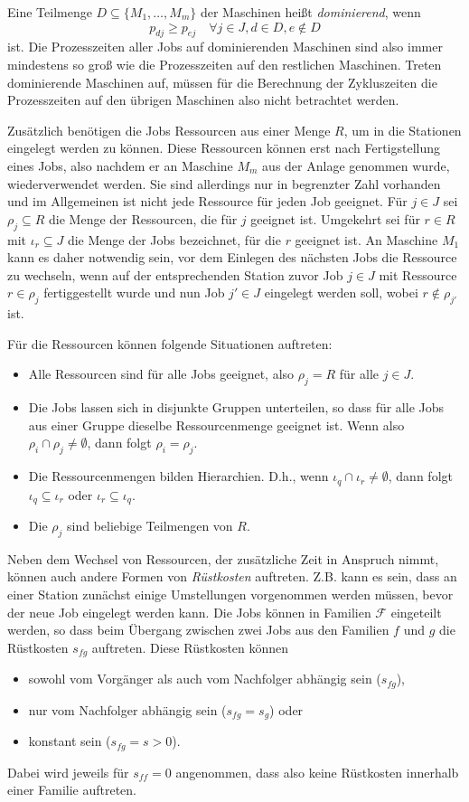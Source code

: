 \documentclass{scrreprt}
\begin{document}
Eine Teilmenge $D \subseteq \{M_1,\ldots,M_m\}$ der Maschinen heißt \textit{dominierend}, wenn 
\[ p_{dj} \geq p_{ej} \quad \forall j\in J, d\in D, e\not\in D \] 
ist. Die Prozesszeiten aller Jobs auf dominierenden Maschinen sind also immer mindestens so groß wie die Prozesszeiten auf den restlichen Maschinen.
Treten dominierende Maschinen auf, müssen für die Berechnung der Zykluszeiten die Prozesszeiten auf den übrigen Maschinen also nicht betrachtet werden.

Zusätzlich benötigen die Jobs Ressourcen aus einer Menge $R$, um in die Stationen eingelegt werden zu können. Diese Ressourcen können erst nach
Fertigstellung eines Jobs, also nachdem er an Maschine $M_m$ aus der Anlage genommen wurde, wiederverwendet werden.
Sie sind allerdings nur in begrenzter Zahl vorhanden und im Allgemeinen ist nicht jede Ressource für jeden Job geeignet.
Für $j\in J$ sei $\rho_j\subseteq R$ die Menge der Ressourcen, die für $j$ geeignet ist.
Umgekehrt sei für $r\in R$ mit $\iota_r\subseteq J$ die Menge der Jobs bezeichnet, für die $r$ geeignet ist.
An Maschine $M_1$ kann es daher notwendig sein, vor dem Einlegen des nächsten Jobs die Ressource zu wechseln, 
wenn auf der entsprechenden Station zuvor Job $j\in J$ mit Ressource $r\in\rho_j$ fertiggestellt wurde 
und nun Job $j'\in J$ eingelegt werden soll, wobei $r\not\in\rho_{j'}$ ist.

Für die Ressourcen können folgende Situationen auftreten:
\begin{itemize}
    \item Alle Ressourcen sind für alle Jobs geeignet, also $\rho_j=R$ für alle $j\in J$.
    \item Die Jobs lassen sich in disjunkte Gruppen unterteilen, so dass für alle Jobs aus einer Gruppe dieselbe Ressourcenmenge geeignet ist.
        Wenn also $\rho_i \cap \rho_j \neq \emptyset$, dann folgt $\rho_i=\rho_j$.
    \item Die Ressourcenmengen bilden Hierarchien. 
        D.h., wenn $\iota_q \cap \iota_r \neq \emptyset$, dann folgt $\iota_q \subseteq \iota_r$ oder $\iota_r \subseteq \iota_q$.
    \item Die $\rho_j$ sind beliebige Teilmengen von $R$.
\end{itemize}%
Neben dem Wechsel von Ressourcen, der zusätzliche Zeit in Anspruch nimmt, können auch andere Formen von \textit{Rüstkosten}
auftreten. Z.B. kann es sein, dass an einer Station zunächst einige Umstellungen vorgenommen werden müssen, bevor der
neue Job eingelegt werden kann. Die Jobs können in Familien $\mathcal{F}$ eingeteilt werden, so dass beim Übergang
zwischen zwei Jobs aus den Familien $f$ und $g$ die Rüstkosten $s_{fg}$ auftreten.
Diese Rüstkosten können 
\begin{itemize}
    \item sowohl vom Vorgänger als auch vom Nachfolger abhängig sein ($s_{fg}$), 
    \item nur vom Nachfolger abhängig sein ($s_{fg} = s_{g}$) oder
    \item konstant sein ($s_{fg} = s > 0$).
\end{itemize}%
Dabei wird jeweils für $s_{ff} = 0$ angenommen, dass also keine Rüstkosten innerhalb einer Familie auftreten.
\end{document}
